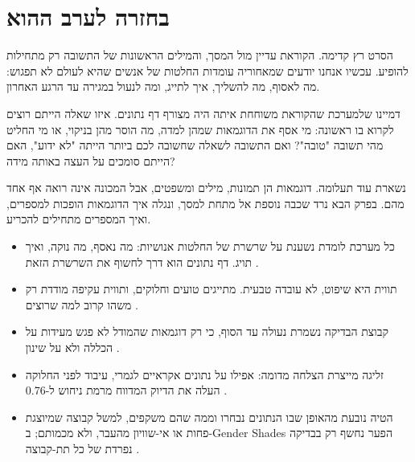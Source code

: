 \section{בחזרה לערב ההוא}
הסרט רץ קדימה. הקוראת עדיין מול המסך, והמילים הראשונות של התשובה רק מתחילות להופיע. עכשיו אנחנו יודעים שמאחוריה עומדות החלטות של אנשים שהיא לעולם לא תפגוש: מה לאסוף, מה להשליך, איך לתייג, ומה לנעול במגירה עד הרגע האחרון.
\begin{thinkbox}
דמיינו שלמערכת שהקוראת משוחחת איתה היה מצורף דף נתונים. איזו שאלה הייתם רוצים לקרוא בו ראשונה: מי אסף את הדוגמאות שמהן למדה, מה הוסר מהן בניקוי, או מי החליט מהי תשובה "טובה"? ואם התשובה לשאלה שחשובה לכם ביותר הייתה "לא ידוע", האם הייתם סומכים על העצה באותה מידה?
\end{thinkbox}
נשארת עוד תעלומה. דוגמאות הן תמונות, מילים ומשפטים, אבל המכונה אינה רואה אף אחד מהם. בפרק הבא נרד שכבה נוספת אל מתחת למסך, ונגלה איך הדוגמאות הופכות למספרים, ואיך המספרים מתחילים להכריע.
\begin{insightsbox}
\begin{itemize}
\item כל מערכת לומדת נשענת על שרשרת של החלטות אנושיות: מה נאסף, מה נוקה, ואיך תויג. דף נתונים הוא דרך לחשוף את השרשרת הזאת \cite{S-ch02-03,S-ch02-04}.
\item תווית היא שיפוט, לא עובדה טבעית. מתייגים טועים וחלוקים, ותווית עקיפה מודדת רק משהו קרוב למה שרוצים \cite{S-ch02-12}.
\item קבוצת הבדיקה נשמרת נעולה עד הסוף, כי רק דוגמאות שהמודל לא פגש מעידות על הכללה ולא על שינון \cite{S-ch02-09,S-ch02-11}.
\item זליגה מייצרת הצלחה מדומה: אפילו על נתונים אקראיים לגמרי, עיבוד לפני החלוקה העלה את הדיוק המדווח מרמת ניחוש ל-0.76 \cite{S-ch02-08}.
\item הטיה נובעת מהאופן שבו הנתונים נבחרו וממה שהם משקפים, למשל קבוצה שמיוצגת פחות או אי-שוויון מהעבר, ולא מכמותם; ב-Gender Shades הפער נחשף רק בבדיקה נפרדת של כל תת-קבוצה \cite{S-ch02-01,S-ch02-14}.
\end{itemize}
\end{insightsbox}
